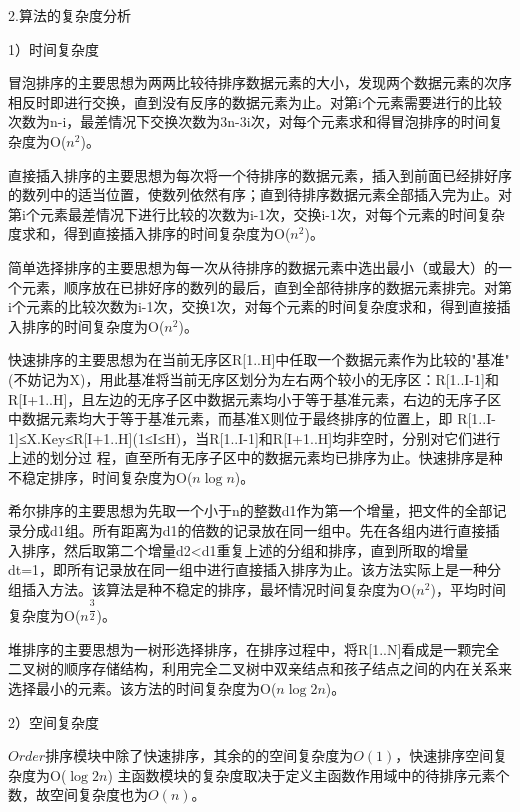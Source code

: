 \documentclass[paper=a4,UTF8,fontsize=11pt]{scrartcl} %
\numberwithin{equation}{section} %
\numberwithin{figure}{section} %
\numberwithin{table}{section} %
\begin{document}
2.算法的复杂度分析

1）时间复杂度

冒泡排序的主要思想为两两比较待排序数据元素的大小，发现两个数据元素的次序相反时即进行交换，直到没有反序的数据元素为止。对第i个元素需要进行的比较次数为n-i，最差情况下交换次数为3n-3i次，对每个元素求和得冒泡排序的时间复杂度为O($n^{2}$)。

直接插入排序的主要思想为每次将一个待排序的数据元素，插入到前面已经排好序的数列中的适当位置，使数列依然有序；直到待排序数据元素全部插入完为止。对第i个元素最差情况下进行比较的次数为i-1次，交换i-1次，对每个元素的时间复杂度求和，得到直接插入排序的时间复杂度为O($n^{2}$)。

简单选择排序的主要思想为每一次从待排序的数据元素中选出最小（或最大）的一个元素，顺序放在已排好序的数列的最后，直到全部待排序的数据元素排完。对第i个元素的比较次数为i-1次，交换1次，对每个元素的时间复杂度求和，得到直接插入排序的时间复杂度为O($n^{2}$)。

快速排序的主要思想为在当前无序区R[1..H]中任取一个数据元素作为比较的"基准"(不妨记为X)，用此基准将当前无序区划分为左右两个较小的无序区：R[1..I-1]和 R[I+1..H]，且左边的无序子区中数据元素均小于等于基准元素，右边的无序子区中数据元素均大于等于基准元素，而基准X则位于最终排序的位置上，即 R[1..I-1]≤X.Key≤R[I+1..H](1≤I≤H)，当R[1..I-1]和R[I+1..H]均非空时，分别对它们进行上述的划分过 程，直至所有无序子区中的数据元素均已排序为止。快速排序是种不稳定排序，时间复杂度为O($n\log{n}$)。

希尔排序的主要思想为先取一个小于n的整数d1作为第一个增量，把文件的全部记录分成d1组。所有距离为d1的倍数的记录放在同一组中。先在各组内进行直接插入排序，然后取第二个增量d2<d1重复上述的分组和排序，直到所取的增量dt=1，即所有记录放在同一组中进行直接插入排序为止。该方法实际上是一种分组插入方法。该算法是种不稳定的排序，最坏情况时间复杂度为O($n^{2}$)，平均时间复杂度为O($n^{\dfrac{3}{2}}$)。

堆排序的主要思想为一树形选择排序，在排序过程中，将R[1..N]看成是一颗完全二叉树的顺序存储结构，利用完全二叉树中双亲结点和孩子结点之间的内在关系来选择最小的元素。该方法的时间复杂度为O($n\log{2}{n}$)。


2）空间复杂度

$Order$排序模块中除了快速排序，其余的的空间复杂度为$O(1)$，快速排序空间复杂度为O($\log{2}{n}$)
主函数模块的复杂度取决于定义主函数作用域中的待排序元素个数，故空间复杂度也为$O(n)$。
\vspace{0.2cm}
\end{document}
